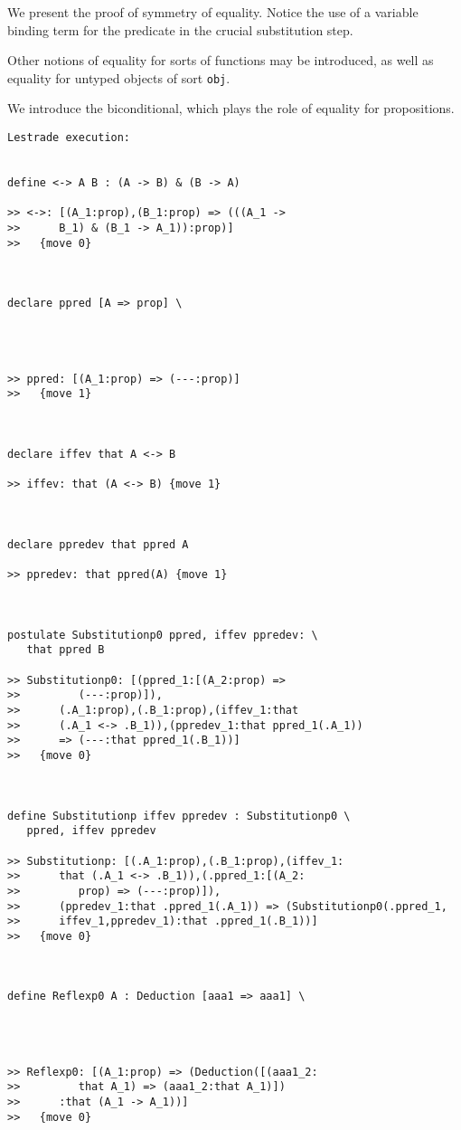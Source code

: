 \documentclass[12pt]{article}
\begin{document}
We present the proof of symmetry of equality.  Notice the use of a variable binding term for the predicate in the crucial substitution step.

Other notions of equality for sorts of functions may be introduced, as well as equality for untyped objects of sort {\tt obj}.

We introduce the biconditional, which plays the role of equality for propositions.

\begin{verbatim}Lestrade execution:


define <-> A B : (A -> B) & (B -> A)

>> <->: [(A_1:prop),(B_1:prop) => (((A_1 ->
>>      B_1) & (B_1 -> A_1)):prop)]
>>   {move 0}



declare ppred [A => prop] \
   



>> ppred: [(A_1:prop) => (---:prop)]
>>   {move 1}



declare iffev that A <-> B

>> iffev: that (A <-> B) {move 1}



declare ppredev that ppred A

>> ppredev: that ppred(A) {move 1}



postulate Substitutionp0 ppred, iffev ppredev: \
   that ppred B

>> Substitutionp0: [(ppred_1:[(A_2:prop) =>
>>         (---:prop)]),
>>      (.A_1:prop),(.B_1:prop),(iffev_1:that
>>      (.A_1 <-> .B_1)),(ppredev_1:that ppred_1(.A_1))
>>      => (---:that ppred_1(.B_1))]
>>   {move 0}



define Substitutionp iffev ppredev : Substitutionp0 \
   ppred, iffev ppredev

>> Substitutionp: [(.A_1:prop),(.B_1:prop),(iffev_1:
>>      that (.A_1 <-> .B_1)),(.ppred_1:[(A_2:
>>         prop) => (---:prop)]),
>>      (ppredev_1:that .ppred_1(.A_1)) => (Substitutionp0(.ppred_1,
>>      iffev_1,ppredev_1):that .ppred_1(.B_1))]
>>   {move 0}



define Reflexp0 A : Deduction [aaa1 => aaa1] \
   



>> Reflexp0: [(A_1:prop) => (Deduction([(aaa1_2:
>>         that A_1) => (aaa1_2:that A_1)])
>>      :that (A_1 -> A_1))]
>>   {move 0}




\end{verbatim}
\end{document}
